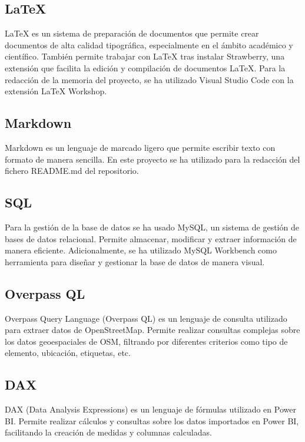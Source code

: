 \subsection{LaTeX}

LaTeX es un sistema de preparación de documentos que permite crear documentos de alta calidad tipográfica, especialmente en el ámbito académico y científico.
También permite trabajar con LaTeX tras instalar Strawberry, una extensión que facilita la edición y compilación de documentos LaTeX.
Para la redacción de la memoria del proyecto, se ha utilizado Visual Studio Code con la extensión LaTeX Workshop.

\subsection{Markdown}

Markdown es un lenguaje de marcado ligero que permite escribir texto con formato de manera sencilla.
En este proyecto se ha utilizado para la redacción del fichero README.md del repositorio.

\subsection{SQL}

Para la gestión de la base de datos se ha usado MySQL, un sistema de gestión de bases de datos relacional.
Permite almacenar, modificar y extraer información de manera eficiente.
Adicionalmente, se ha utilizado MySQL Workbench como herramienta para diseñar y gestionar la base de datos de manera visual.

\subsection{Overpass QL}
Overpass Query Language (Overpass QL) es un lenguaje de consulta utilizado para extraer datos de OpenStreetMap.
Permite realizar consultas complejas sobre los datos geoespaciales de OSM, filtrando por diferentes criterios como tipo de elemento, ubicación, etiquetas, etc.

\subsection{DAX}

DAX (Data Analysis Expressions) es un lenguaje de fórmulas utilizado en Power BI.
Permite realizar cálculos y consultas sobre los datos importados en Power BI, facilitando la creación de medidas y columnas calculadas.

